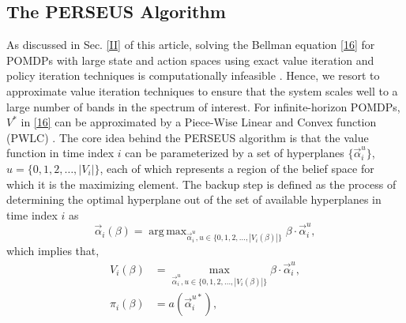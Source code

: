 \documentclass[10pt,twocolumn]{IEEEtran}
\DeclareMathOperator*{\argmax}{arg\,max}
\begin{document}
\subsection{The PERSEUS Algorithm}
As discussed in Sec. \ref{II} of this article, solving the Bellman equation \eqref{16} for POMDPs with large state and action spaces using exact value iteration and policy iteration techniques is computationally infeasible \cite{DBLP:journals/corr/abs-1109-2145}. Hence, we resort to approximate value iteration techniques to ensure that the system scales well to a large number of bands in the spectrum of interest. For infinite-horizon POMDPs, $V^*$ in \eqref{16} can be approximated by a Piece-Wise Linear and Convex function (PWLC) \cite{DBLP:journals/corr/abs-1109-2145}. The core idea behind the PERSEUS algorithm is that the value function in time index $i$ can be parameterized by a set of hyperplanes $\{\vec{\alpha}_i^{u}\}$, $u = \{0,1,2,\dots,|V_i|\}$, each of which represents a region of the belief space for which it is the maximizing element. The backup step is defined as the process of determining the optimal hyperplane out of the set of available hyperplanes in time index $i$ as
\begin{equation}\label{39}
    \vec{\alpha}_{i}(\beta) = \argmax_{\vec{\alpha}_{i}^u, u {\in} \{0, 1, 2, \dots, |V_i(\beta)|\}} \beta \cdot \vec{\alpha}_{i}^u,
\end{equation}
which implies that,
\begin{equation}\label{40}
    \begin{split}
        V_i(\beta) &= \max_{\vec{\alpha}_{i}^u, u {\in} \{0, 1, 2, \dots, |V_i(\beta)|\}} \beta \cdot \vec{\alpha}_{i}^u,\\
        \pi_i(\beta) &= a(\vec{\alpha}_i^{u*}),
    \end{split}
\end{equation}
\end{document}
